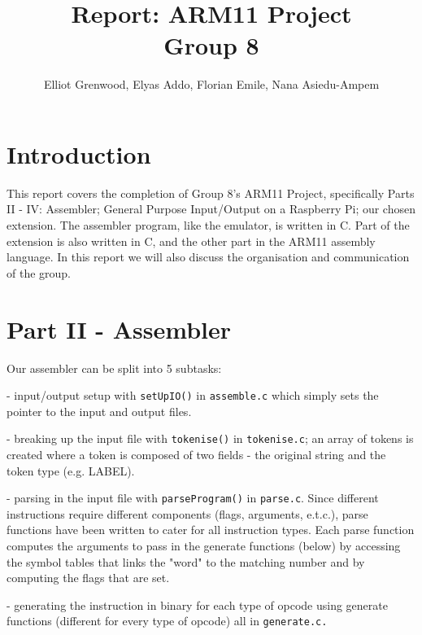 \documentclass[11pt]{article}
\begin{document}
\title{Report: ARM11 Project \\ Group 8}
\author{Elliot Grenwood, Elyas Addo, Florian Emile, Nana Asiedu-Ampem}

\maketitle

\section{Introduction}
This report covers the completion of Group 8's ARM11 Project, specifically Parts II - IV: Assembler; General Purpose Input/Output on a Raspberry Pi; our chosen extension. The assembler program, like the emulator, is written in C. Part of the extension is also written in C, and the other part in the ARM11 assembly language. In this report we will also discuss the organisation and communication of the group.

\section{Part II - Assembler}

Our assembler can be split into 5 subtasks:\newline

- input/output setup with \verb|setUpIO()| in \texttt{assemble.c} which simply sets the pointer
to the input and output files.\newline

- breaking up the input file with \verb|tokenise()| in \texttt{tokenise.c}; an array of tokens is created where a token is composed of two fields - the original string and the token type (e.g. LABEL).\newline

- parsing in the input file with \verb|parseProgram()| in \texttt{parse.c}. Since different instructions require different components (flags, arguments, e.t.c.), parse functions have been written to cater for all instruction types. Each parse function computes the arguments to pass in the generate functions (below) by accessing the symbol tables that links the "word" to the matching number and by
computing the flags that are set.\newline 

- generating the instruction in binary for each type of opcode using generate
functions (different for every type of opcode) all in \texttt{generate.c.}\newline
\end{document}
